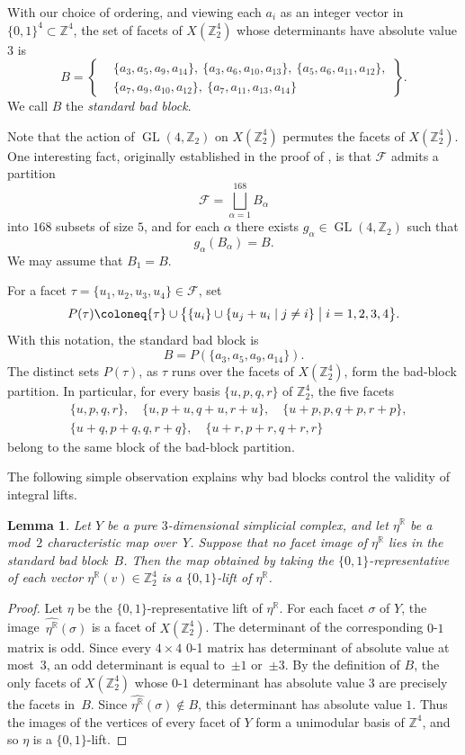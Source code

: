 \documentclass{amsart}
\newcommand{\Z}{\mathbb{Z}}
\newcommand{\R}{\mathbb{R}}
\newcommand{\cF}{\mathcal{F}}
\DeclareMathOperator{\GL}{GL}
\newtheorem{lemma}[theorem]{Lemma}
\theoremstyle{definition}
\theoremstyle{remark}
\begin{document}
With our choice of ordering, and viewing each $a_i$ as an integer vector in $\{0,1\}^4\subset \Z^4$, the set of facets of $X(\Z_2^4)$ whose determinants have absolute value $3$ is
$$
    B= \left\{
        \begin{aligned}
            &\{a_3,a_5,a_9,a_{14}\},\ \{a_3,a_6,a_{10},a_{13}\},\ \{a_5,a_6,a_{11},a_{12}\},\\
            &\{a_7,a_9,a_{10},a_{12}\},\ \{a_7,a_{11},a_{13},a_{14}\}
        \end{aligned}
    \right\}.
$$
We call $B$ the \emph{standard bad block}.

Note that the action of $\GL(4,\Z_2)$ on $X(\Z_2^4)$ permutes the facets of $X(\Z_2^4)$.
One interesting fact, originally established in the proof of \cite[Theorem~6.1]{Choi-Jang-Vallee2025JLMS}, is that $\cF$ admits a partition
$$
    \cF=\bigsqcup_{\alpha=1}^{168} B_\alpha
$$
into $168$ subsets of size $5$, and for each $\alpha$ there exists $g_\alpha\in \GL(4,\Z_2)$ such that
$$
    g_\alpha(B_\alpha)=B.
$$
We may assume that $B_1=B$.

For a facet $\tau=\{u_1,u_2,u_3,u_4\}\in \cF$, set
$$
    P(\tau)\coloneq \{\tau\}\cup \bigl\{ \{u_i\}\cup \{u_j+u_i\mid j\neq i\} \bigm| i=1,2,3,4 \bigr\}.
$$
With this notation, the standard bad block is
$$
    B=P(\{a_3,a_5,a_9,a_{14}\}).
$$
The distinct sets $P(\tau)$, as $\tau$ runs over the facets of $X(\Z_2^4)$, form the bad-block partition.
In particular, for every basis $\{u,p,q,r\}$ of $\Z_2^4$, the five facets
\begin{align*}
    &\{u,p,q,r\},\quad \{u,p+u,q+u,r+u\},\quad  \{u+p,p,q+p,r+p\}, \\
    &\{u+q,p+q,q,r+q\},\quad \{u+r,p+r,q+r,r\}  
\end{align*}
belong to the same block of the bad-block partition.

The following simple observation explains why bad blocks control the validity of integral lifts.

\begin{lemma}\label{lem:avoid-standard-bad-block}
    Let $Y$ be a pure $3$-dimensional simplicial complex, and let $\eta^\R$ be a mod~$2$ characteristic map over~$Y$.
    Suppose that no facet image of $\eta^\R$ lies in the standard bad block~$B$.
    Then the map obtained by taking the $\{0,1\}$-representative of each vector $\eta^\R(v)\in \Z_2^4$ is a $\{0,1\}$-lift of $\eta^\R$.
\end{lemma}
\begin{proof}
    Let $\eta$ be the $\{0,1\}$-representative lift of $\eta^\R$.
    For each facet $\sigma$ of $Y$, the image~$\widehat{\eta^\R}(\sigma)$ is a facet of $X(\Z_2^4)$.
    The determinant of the corresponding $0$-$1$ matrix is odd.
    Since every $4\times4$ 0-1 matrix has determinant of absolute value at most~$3$, an odd determinant is equal to~$\pm 1$ or~$\pm 3$.
    By the definition of $B$, the only facets of $X(\Z_2^4)$ whose $0$-$1$ determinant has absolute value $3$ are precisely the facets in~$B$.
    Since $\widehat{\eta^\R}(\sigma)\notin B$, this determinant has absolute value $1$.
    Thus the images of the vertices of every facet of $Y$ form a unimodular basis of $\Z^4$, and so $\eta$ is a $\{0,1\}$-lift.
\end{proof}
\end{document}
